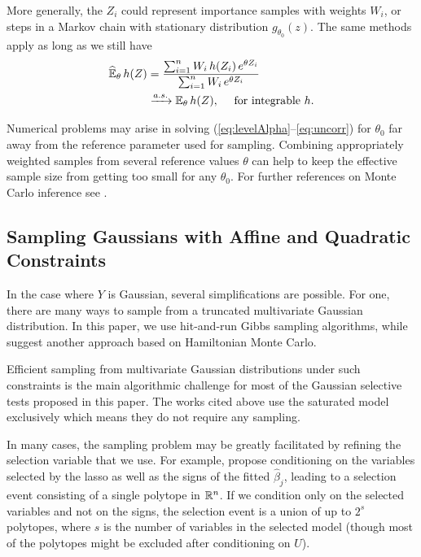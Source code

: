 \documentclass{article}
\theoremstyle{definition}
\begin{document}
More generally, the $Z_i$ could represent importance samples with weights $W_i$, or steps in a Markov chain with stationary distribution
$g_{\theta_0}(z)$. The same methods apply as long as we still have
\begin{align}
  \widehat {\mathbb{E}}_\theta\, h(Z) &=
  \frac{\sum_{i=1}^n W_i\, h(Z_i)\, e^{\theta Z_i}}
  {\sum_{i=1}^n W_i\, e^{\theta Z_i}}\\
  &\xrightarrow[]{a.s.} \mathbb{E}_\theta\, h(Z), \quad \text{ for integrable } h.
\end{align}

Numerical problems may arise in solving (\ref{eq:levelAlpha}--\ref{eq:uncorr}) for $\theta_0$ far away from the reference parameter used for sampling. Combining appropriately weighted samples from several reference values $\theta$ can help to keep the effective sample size from getting too small for any $\theta_0$. For further references on Monte Carlo inference see
\citet{jockel1986finite, besag1989generalized,forster1996monte,mehta2000efficient}.


\subsection{Sampling Gaussians with Affine and Quadratic Constraints}\label{sec:affine}


In the case where $Y$ is Gaussian, several simplifications are possible. For one, there are many ways to sample from a truncated multivariate Gaussian distribution. In this paper, we use hit-and-run Gibbs sampling algorithms, while \citet{pakman2014exact} suggest another approach based on Hamiltonian Monte Carlo.

Efficient sampling from multivariate Gaussian distributions under such constraints is the main algorithmic challenge for most of the Gaussian selective tests proposed in this paper. The works cited above use the saturated model exclusively which means they do not require any sampling.

In many cases, the sampling problem may be greatly facilitated by refining the selection variable that we use. For example, \citet{lee2013exact} propose conditioning on the variables selected by the lasso as well as the signs of the fitted $\hat\beta_j$, leading to a selection event consisting of a single polytope in $\mathbb{R}^n$. If we condition only on the selected variables and not on the signs, the selection event is a union of up to $2^s$ polytopes, where $s$ is the number of variables in the selected model (though most of the polytopes might be excluded after conditioning on $U$).
\end{document}
